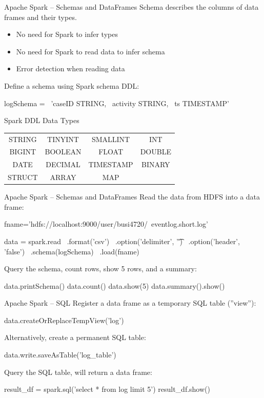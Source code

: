 \documentclass[ignorenonframetext,xcolor=x11names]{beamer}
\begin{document}
\begin{frame}[fragile]{Apache Spark -- Schemas and DataFrames}
Schema describes the columns of data frames and their types.
\begin{itemize}
   \item No need for Spark to infer types
   \item No need for Spark to read data to infer schema
   \item Error detection when reading data
\end{itemize}
Define a schema using Spark schema DDL:
\begin{pythoncode}
logSchema = \
    'caseID STRING, \
     activity STRING, \
     ts TIMESTAMP'
\end{pythoncode}
\vspace{-\baselineskip}
\begin{block}{\small Spark DDL Data Types}
\begin{center}
\renewcommand{\arraystretch}{1.5}
\footnotesize
\begin{tabular}{cccc} 
STRING & TINYINT & SMALLINT & INT \\
BIGINT & BOOLEAN & FLOAT & DOUBLE \\
DATE & DECIMAL & TIMESTAMP & BINARY \\ \hline
STRUCT & ARRAY & MAP \\
\end{tabular}
\end{center}
\end{block}
\end{frame}


\begin{frame}[fragile]{Apache Spark -- Schemas and DataFrames}
Read the data from HDFS into a data frame:
\begin{pythoncode}
fname='hdfs://localhost:9000/user/busi4720/\
eventlog.short.log'

data = spark.read \
    .format('csv') \
    .option('delimiter', '\t') \
    .option('header', 'false') \
    .schema(logSchema) \
    .load(fname)
\end{pythoncode}
Query the schema, count rows, show 5 rows, and a summary:
\begin{pythoncode}
data.printSchema()
data.count()
data.show(5)
data.summary().show()
\end{pythoncode}
\end{frame}


\begin{frame}[fragile]{Apache Spark -- SQL}
\small
Register a data frame as a temporary SQL table (''view''):
\begin{pythoncode}
data.createOrReplaceTempView('log')
\end{pythoncode}
Alternatively, create a permanent SQL table:
\begin{pythoncode}
data.write.saveAsTable('log_table')
\end{pythoncode}
Query the SQL table, will return a data frame:
\begin{pythoncode}
result_df = spark.sql('select * from log limit 5')
result_df.show()
\end{pythoncode}
\end{frame}
\end{document}
